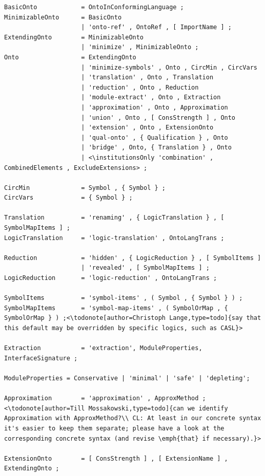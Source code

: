 \documentclass[10pt,%
\ifpretendfinal
final%
\else
draft%
\fi,
]{scrreprt}
\makeatletter
\newcommand*\CommentAuthor{}
\renewcommand*\CommentAuthor{#1}}
\newcommand*\CommentDate{}
\renewcommand*\CommentDate{#1}}
\newcommand*\CommentId{}
\renewcommand*\CommentId{#1}}
\newcommand*\CommentType{}
\renewcommand*\CommentType{#1}}
\newcommand*{\SetCommentColorByType}[1]{%
\edef\localType{{#1}}%
\expandafter\ifstrequal\localType{q-aut}{\colorlet{CommentColor}{red}}{%
\expandafter\ifstrequal\localType{q-all}{\colorlet{CommentColor}{orange}}{%
\expandafter\ifstrequal\localType{todo}{\colorlet{CommentColor}{orange}}{%
\expandafter\ifstrequal\localType{fyi}{\colorlet{CommentColor}{lightgray}}{%
\colorlet{CommentColor}{yellow}}}}}}
\newcommand*{\SetCommentPrefixByType}[1]{%
\edef\localType{{#1}}%
\expandafter\@ifmtarg\localType{%
\edef\CommentPrefix{}%
}{%
\caseupper[q]{#1}%
\edef\CommentPrefix{\thestring: }%
}}
\newcommand*{\initComment}[1]{%
\setkeys{Comment}{#1}%
\SetCommentColorByType{\CommentType}%
\relax%
\SetCommentPrefixByType{\CommentType}%
\relax%
}
\newcommand*{\todonote}[2][]{%
\initComment{#1}%
\pdfcomment[author=\CommentAuthor,color=CommentColor,date=\CommentDate,id=\CommentId]{%
\CommentPrefix
#2}}
\renewcommand*{\todonote}[2][]{%
\initComment{#1}%
\ednote{\CommentPrefix #2}}
\newcommand*{\institutionsOnly}{\bfseries\itshape}
\makeatother
\begin{document}
\begin{lstlisting}[language=ebnf,escapeinside={<>}]
BasicOnto            = OntoInConformingLanguage ;
MinimizableOnto      = BasicOnto
                     | 'onto-ref' , OntoRef , [ ImportName ] ;
ExtendingOnto        = MinimizableOnto
                     | 'minimize' , MinimizableOnto ;
Onto                 = ExtendingOnto
                     | 'minimize-symbols' , Onto , CircMin , CircVars
                     | 'translation' , Onto , Translation
                     | 'reduction' , Onto , Reduction
                     | 'module-extract' , Onto , Extraction 
                     | 'approximation' , Onto , Approximation
                     | 'union' , Onto , [ ConsStrength ] , Onto 
                     | 'extension' , Onto , ExtensionOnto
                     | 'qual-onto' , { Qualification } , Onto
                     | 'bridge' , Onto, { Translation } , Onto
                     | <\institutionsOnly 'combination' , CombinedElements , ExcludeExtensions> ;

CircMin              = Symbol , { Symbol } ;
CircVars             = { Symbol } ;

Translation          = 'renaming' , { LogicTranslation } , [ SymbolMapItems ] ;
LogicTranslation     = 'logic-translation' , OntoLangTrans ;

Reduction            = 'hidden' , { LogicReduction } , [ SymbolItems ]
                     | 'revealed' , [ SymbolMapItems ] ;
LogicReduction       = 'logic-reduction' , OntoLangTrans ;

SymbolItems          = 'symbol-items' , ( Symbol , { Symbol } ) ;
SymbolMapItems       = 'symbol-map-items' , ( SymbolOrMap , { SymbolOrMap } ) ;<\todonote[author=Christoph Lange,type=todo]{say that this default may be overridden by specific logics, such as CASL}>

Extraction           = 'extraction', ModuleProperties, InterfaceSignature ;

ModuleProperties = Conservative | 'minimal' | 'safe' | 'depleting'; 

Approximation        = 'approximation' , ApproxMethod ;<\todonote[author=Till Mossakowski,type=todo]{can we identify Approximation with ApproxMethod?\\ CL: At least in our concrete syntax it's easier to keep them separate; please have a look at the corresponding concrete syntax (and revise \emph{that} if necessary).}>

ExtensionOnto        = [ ConsStrength ] , [ ExtensionName ] , ExtendingOnto ;


\end{lstlisting}
\end{document}
